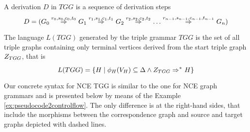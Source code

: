\documentclass[runningheads]{llncs}
\begin{document}

\begin{definition}
	A derivation $D$ in $TGG$ is a sequence of derivation steps
	\begin{equation*}
		D = (G_0 \tderiv{r_0}{s_0,c_0,t_0}{} G_1 \tderiv{r_1}{s_1,c_1,t_1}{} G_2 \tderiv{r_2}{s_2,c_2,t_2}{} \dots \tderiv{r_{n-1}}{s_{n-1},c_{n-1},t_{n-1}}{} G_n)
	\end{equation*}
\end{definition}

\begin{definition}
	\label{def:tlanguage}
	The language $L(TGG)$ generated by the triple grammar $TGG$ is the set of all triple graphs containing only terminal vertices derived from the start triple graph $Z_{TGG}$, that is
	\begin{equation*}
		L(TGG) = \{H \st \phi_H(V_H) \subseteq \Delta \land \startTG{TGG} \tderivtr{}{}{} H\}
	\end{equation*}
\end{definition}

Our concrete syntax for NCE TGG is similar to the one for NCE graph grammars and is presented below by means of the Example \ref{ex:pseudocode2controlflow}. The only difference is at the right-hand sides, that include the morphisms between the correspondence graph and source and target graphs depicted with dashed lines.
\end{document}
